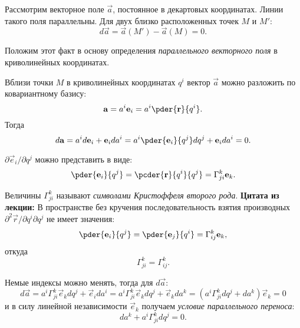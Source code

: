 
Рассмотрим векторное поле \( \vec{a} \), постоянное в декартовых координатах.
Линии такого поля параллельны. Для двух близко расположенных точек \( M \) и
\( M' \):
\[
    d\vec{a} = \vec{a}(M') - \vec{a}(M) = 0.
\]
    
Положим этот факт в основу определения \emph{параллельного векторного поля} в
криволинейных координатах.

Вблизи точки \( M \) в криволинейных координатах \( q^i \) вектор \( \vec{a} \)
можно разложить по ковариантному базису:
\[
    \vec{a} = a^i \vec{e}_{i} = a^i \pder{\vec{r}}{q^i}.
\]
Тогда
\[
    d\vec{a} = a^i d\vec{e}_{i} + \vec{e}_{i} da^i  = 
    a^i \pder{\vec{e}_{i}}{q^j} dq^j + \vec{e}_{i} da^i = 0.
\]
    
\( \partial\vec{e}_{i}/{\partial q^j} \) можно представить в виде:
\[
    \pder{\vec{e}_{i}}{q^j} = 
    \pcder{\vec{r}}{q^i}{q^j} =
    \Gamma^k_{ji} \vec{e}_{k}.
\]

Величины \( \Gamma^k_{ji} \) называют \emph{символами Кристоффеля второго рода}.
\textbf{Цитата из лекции:} В пространстве без кручения последовательность
взятия производных \( \partial^2{\vec{r}}/{\partial q^i \partial  q^j} \) не
имеет значения:
\[
    \pder{\vec{e}_{i}}{q^j} = 
    \pder{\vec{e}_{j}}{q^i} =
    \Gamma^k_{ij} \vec{e}_{k},
\]
откуда
\[
    \Gamma^k_{ji} = \Gamma^k_{ij}.
\]

Немые индексы можно менять, тогда для \( d\vec{a} \):
\[
    d\vec{a} = 
    a^i \Gamma^k_{ji} \vec{e}_{k} dq^j + \vec{e}_{i} da^i = 
    a^i \Gamma^k_{ji} \vec{e}_{k} dq^j + \vec{e}_{k} da^k =
    \left(a^i \Gamma^k_{ji} dq^j + da^k\right)\vec{e}_{k}  =
    0
\]
и в силу линейной независимости \( \vec{e}_{k} \) получаем \emph{условие
параллельного переноса}:
\[
    da^k + a^i \Gamma^k_{ji} dq^j  = 0.
\]
    
